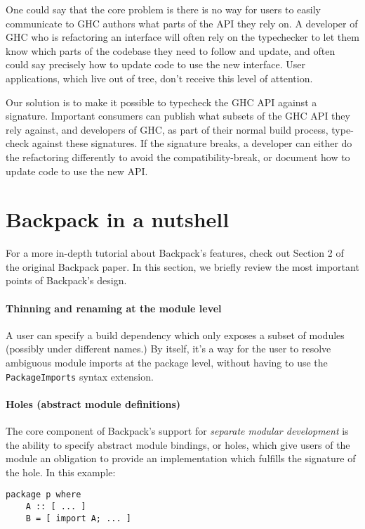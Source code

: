 \documentclass{article}
\begin{document}
One could say that the core problem is there is no way for users to
easily communicate to GHC authors what parts of the API they rely on.  A
developer of GHC who is refactoring an interface will often rely on the
typechecker to let them know which parts of the codebase they need to
follow and update, and often could say precisely how to update code to
use the new interface.  User applications, which live out of tree, don't
receive this level of attention.

Our solution is to make it possible to typecheck the GHC API against a
signature.  Important consumers can publish what subsets of the GHC API
they rely against, and developers of GHC, as part of their normal build
process, type-check against these signatures.  If the signature breaks,
a developer can either do the refactoring differently to avoid the
compatibility-break, or document how to update code to use the new API\@.

\section{Backpack in a nutshell}

For a more in-depth tutorial about Backpack's features, check out Section 2
of the original Backpack paper.  In this section, we briefly review the
most important points of Backpack's design.

\paragraph{Thinning and renaming at the module level}
A user can specify a build dependency which only exposes a subset of
modules (possibly under different names.)  By itself, it's a way for the
user to resolve ambiguous module imports at the package level, without
having to use the \texttt{PackageImports} syntax extension.

\paragraph{Holes (abstract module definitions)}  The core
component of Backpack's support for \emph{separate modular development}
is the ability to specify abstract module bindings, or holes, which give
users of the module an obligation to provide an implementation which
fulfills the signature of the hole.  In this example:

\begin{verbatim}
package p where
    A :: [ ... ]
    B = [ import A; ... ]
\end{verbatim}
\end{document}
